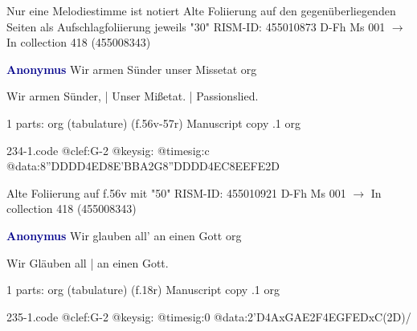 \documentclass[twocolumn]{book}
\begin{document}
\newline Nur eine Melodiestimme ist notiert
\newline Alte Foliierung auf den gegenüberliegenden Seiten als Aufschlagfoliierung jeweils "30"
\newline RISM-ID: 455010873
\newline D-Fh  Ms 001
\newline $\rightarrow$ In collection 418 (455008343)
      
\newline \par \vspace{7pt} \textcolor{darkblue}{\textbf{Anonymus  }}
\newline Wir armen Sünder unser Missetat
\newline org
\newline \begin{itshape}[f.56v, at left:] Wir armen Sünder, | Unser Mißetat. | Passionslied.\end{itshape} 
\newline \textcolor{darkblue}{}  1 parts: org (tabulature)  (f.56v-57r)
\newline Manuscript copy
.1  org  
\begin{filecontents*}{234-1.code}
@clef:G-2
@keysig:
@timesig:c
@data:{8''DDDD}4ED{8E'BBA}2G{8''DDDD}4EC{8EEFE}2D
\end{filecontents*}
\newline
%

\newline Alte Foliierung auf f.56v mit "50"
\newline RISM-ID: 455010921
\newline D-Fh  Ms 001
\newline $\rightarrow$ In collection 418 (455008343)
      
\newline \par \vspace{7pt} \textcolor{darkblue}{\textbf{Anonymus  }}
\newline Wir glauben all' an einen Gott
\newline org
\newline \begin{itshape}[f.18r, at left:] Wir Gläuben all | an einen Gott.\end{itshape} 
\newline \textcolor{darkblue}{}  1 parts: org (tabulature)  (f.18r)
\newline Manuscript copy
.1  org  
\begin{filecontents*}{235-1.code}
@clef:G-2
@keysig:
@timesig:0
@data:2'D4AxGAE2F4EGFEDxC(2D)/
\end{filecontents*}
\newline
%
\end{document}
